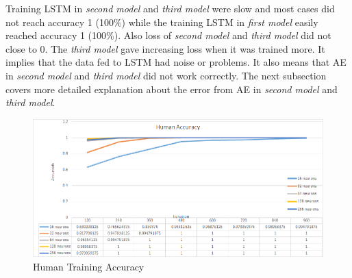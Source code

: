 \documentclass[draft,dvipsnames]{drexel-thesis}
\begin{document}
\begin{thesis}

Training LSTM in {\em second model} and {\em third model} were slow and most cases did not reach accuracy 1 (100\%) while the training LSTM in {\em first model} easily reached accuracy 1 (100\%). Also loss of {\em second model} and {\em third model} did not close to 0. The {\em third model} gave increasing loss when it was trained more. It implies that the data fed to LSTM had noise or problems. It also means that AE in {\em second model} and {\em third model} did not work correctly. The next subsection covers more detailed explanation about the error from AE in {\em second model} and {\em third model}.

\begin{figure}[t!]
    \centering
    \includegraphics[width=\textwidth]{pictures/result_pictures/Human_Accuracy.png}
    \caption{Human Training Accuracy}
    \label{fig:human_accuracy}
\end{figure}


\end{thesis}
\end{document}
